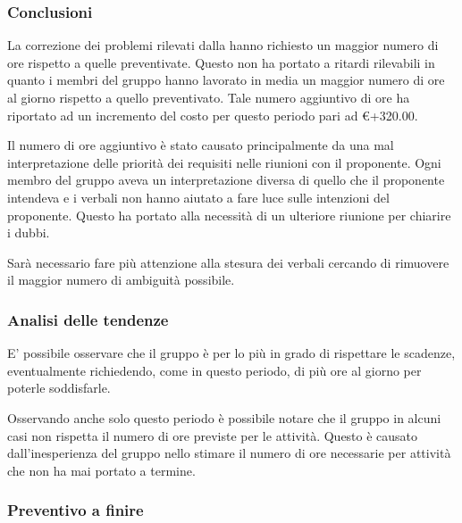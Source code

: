 \documentclass[12pt,a4paper]{article}
\begin{document}
\subsubsection{Conclusioni}

\par La correzione dei problemi rilevati dalla \RR{} hanno richiesto un maggior numero di ore rispetto a quelle preventivate. Questo non ha portato a ritardi rilevabili in quanto i membri del gruppo hanno lavorato in media un maggior numero di ore al giorno rispetto a quello preventivato. Tale numero aggiuntivo di ore ha riportato ad un incremento del costo per questo periodo pari ad \euro{}+320.00. \\

\par Il numero di ore aggiuntivo è stato causato principalmente da una mal interpretazione delle priorità dei requisiti nelle riunioni con il proponente. Ogni membro del gruppo aveva un interpretazione diversa di quello che il proponente intendeva e i verbali non hanno aiutato a fare luce sulle intenzioni del proponente. Questo ha portato alla necessità di un ulteriore riunione per chiarire i dubbi. \\

\par Sarà necessario fare più attenzione alla stesura dei verbali cercando di rimuovere il maggior numero di ambiguità possibile. \\

\subsubsection{Analisi delle tendenze}

\par E' possibile osservare che il gruppo è per lo più in grado di rispettare le scadenze, eventualmente richiedendo, come in questo periodo, di più ore al giorno per poterle soddisfarle. \\

\par Osservando anche solo questo periodo è possibile notare che il gruppo in alcuni casi non rispetta il numero di ore previste per le attività. Questo è causato dall'inesperienza del gruppo nello stimare il numero di ore necessarie per attività che non ha mai portato a termine. \\

\subsubsection{Preventivo a finire}
\end{document}
